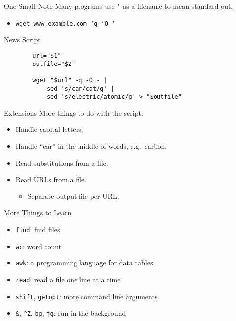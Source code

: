 \documentclass[pdf,usenames,dvipsnames,14pt]{beamer}%
\newcommand\hyphen{\char`\-}
\newcommand\textasciicaret{\textasciicircum}
\begin{document}
\begin{frame}{One Small Note}
	Many programs use \texttt{\hyphen} as a filename to mean standard out.
	\begin{itemize}
		\item \texttt{wget www.example.com \hyphen q \hyphen O {\hyphen}}
	\end{itemize}
\end{frame}

\begin{frame}[fragile]{News Script}
	\begin{verbatim}
		url="$1"
		outfile="$2"
		
		wget "$url" -q -O - |
		    sed 's/car/cat/g' |
		    sed 's/electric/atomic/g' > "$outfile"
	\end{verbatim}
\end{frame}

\begin{frame}{Extensions}
	More things to do with the script:
	\begin{itemize}
		\item Handle capital letters.
		\item Handle ``car'' in the middle of words, e.g.\ carbon.
		\item Read substitutions from a file.
		\item Read URLs from a file.
		\begin{itemize}
			\item Separate output file per URL.
		\end{itemize}
	\end{itemize}
\end{frame}

\begin{frame}{More Things to Learn}
	\begin{itemize}
		\item \texttt{find}: find files
		\item \texttt{wc}: word count
		\item \texttt{awk}: a programming language for data tables
		\item \texttt{read}: read a file one line at a time
		\item \texttt{shift}, \texttt{getopt}: more command line arguments
		\item \texttt{\&}, \texttt{\textasciicaret Z}, \texttt{bg}, \texttt{fg}: run in the background
	\end{itemize}
\end{frame}
\end{document}
